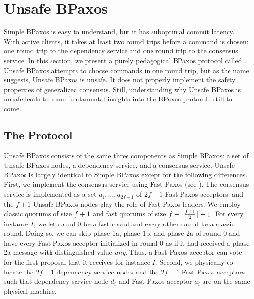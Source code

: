 \section{Unsafe BPaxos}
Simple BPaxos is easy to understand, but it has suboptimal commit latency.
With active clients, it takes at least two round trips before a command is
chosen: one round trip to the dependency service and one round trip to the
consensus service. In this section, we present a purely pedagogical BPaxos
protocol called . Unsafe BPaxos attempts to choose
commands in one round trip, but as the name suggests, Unsafe BPaxos is unsafe.
It does not properly implement the safety properties of generalized consensus.
Still, understanding why Unsafe BPaxos is unsafe leads to some fundamental
insights into the BPaxos protocols still to come.

\subsection{The Protocol}
Unsafe BPaxos consists of the same three components as Simple BPaxos: a set of
Unsafe BPaxos nodes, a dependency service, and a consensus service. Unsafe
BPaxos is largely identical to Simple BPaxos except for the following
differences.
%
First, we implement the consensus service using Fast Paxos (see
). The consensus service is implemented as a set $a_1,
\ldots, a_{2f + 1}$ of $2f + 1$ Fast Paxos acceptors, and the $f + 1$ Unsafe
BPaxos nodes play the role of Fast Paxos leaders. We employ classic quorums of
size $f + 1$ and fast quorums of size $f + \lfloor\frac{f + 1}{2}\rfloor + 1$. For every
instance $I$, we let round $0$ be a fast round and every other round be a
classic round. Doing so, we can skip phase 1a, phase 1b, and phase 2a of round
$0$ and have every Fast Paxos acceptor initialized in round $0$ as if it had
received a phase 2a message with distinguished value \emph{any}. Thus, a Fast
Paxos acceptor can vote for the first proposal that it receives for instance
$I$.
%
Second, we physically co-locate the $2f + 1$ dependency service nodes and the
$2f + 1$ Fast Paxos acceptors such that dependency service node $d_i$ and Fast
Paxos acceptor $a_i$ are on the same physical machine.

